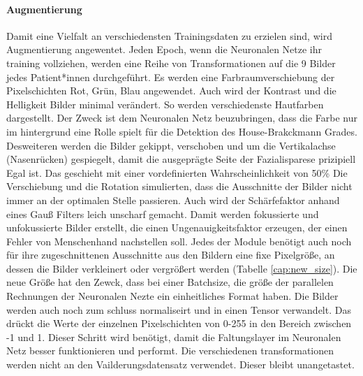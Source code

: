 \paragraph{Augmentierung} Damit eine Vielfalt an verschiedensten Trainingsdaten zu erzielen sind, wird Augmentierung angewentet. Jeden Epoch, wenn die Neuronalen Netze ihr training vollziehen, werden eine Reihe von Transformationen auf die 9 Bilder jedes Patient*innen durchgeführt. Es werden eine Farbraumverschiebung der Pixelschichten Rot, Grün, Blau angewendet. Auch wird der Kontrast und die Helligkeit Bilder minimal verändert. So werden verschiedenste Hautfarben dargestellt. Der Zweck ist dem Neuronalen Netz beuzubringen, dass die Farbe nur im hintergrund eine Rolle spielt für die Detektion des House-Brakckmann Grades. Desweiteren werden die Bilder gekippt, verschoben und um die Vertikalachse (Nasenrücken) gespiegelt, damit die ausgeprägte Seite der Fazialisparese prizipiell Egal ist. Das geschieht mit einer vordefinierten Wahrscheinlichkeit von 50\% Die Verschiebung und die Rotation simulierten, dass die Ausschnitte der Bilder nicht immer an der optimalen Stelle passieren. Auch wird der Schärfefaktor anhand eines Gauß Filters leich unscharf gemacht. Damit werden fokussierte und unfokussierte Bilder erstellt, die einen Ungenauigkeitsfaktor erzeugen, der einen Fehler von Menschenhand nachstellen soll. Jedes der Module benötigt auch noch für ihre zugeschnittenen Ausschnitte aus den Bildern eine fixe Pixelgröße, an dessen die Bilder verkleinert oder vergrößert werden (Tabelle \ref{cap:new_size}). Die neue Größe hat den Zewck, dass bei einer Batchsize, die größe der parallelen Rechnungen der Neuronalen Nezte ein einheitliches Format haben. Die Bilder werden auch noch zum schluss normaliseirt und in einen Tensor verwandelt. Das drückt die Werte der einzelnen Pixelschichten von 0-255 in den Bereich zwischen -1 und 1. Dieser Schritt wird benötigt, damit die Faltungslayer im Neuronalen Netz besser funktionieren und performt.
Die verschiedenen transformationen werden nicht an den Vailderungsdatensatz verwendet. Dieser bleibt unangetastet.

